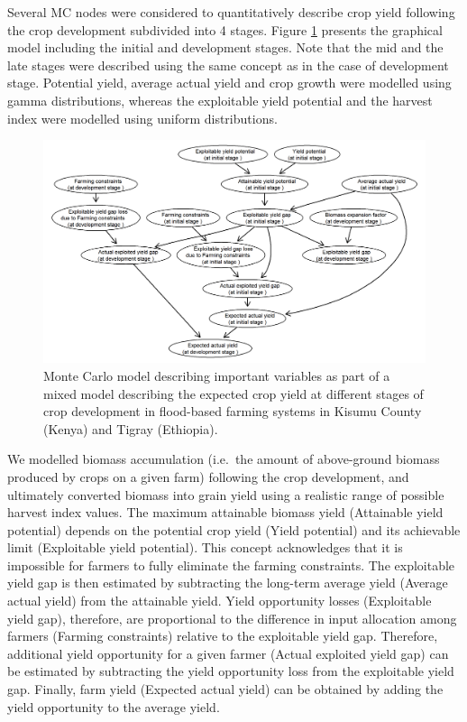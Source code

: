 \documentclass[]{elsarticle} %
\begin{document}
Several MC nodes were considered to quantitatively describe crop yield following the crop development subdivided into 4 stages. Figure \ref{fig:fig9} presents the graphical model including the initial and development stages. Note that the mid and the late stages were described using the same concept as in the case of development stage. Potential yield, average actual yield and crop growth were modelled using gamma distributions, whereas the exploitable yield potential and the harvest index were modelled using uniform distributions.

\begin{figure}[!h]

{\centering \includegraphics[width=1\linewidth,]{figures/figure_s9} 

}

\caption{Monte Carlo model describing important variables as part of a mixed model describing the expected crop yield at different stages of crop development in flood-based farming systems in Kisumu County (Kenya) and Tigray (Ethiopia).}\label{fig:fig9}
\end{figure}

We modelled biomass accumulation (i.e.~the amount of above-ground biomass produced by crops on a given farm) following the crop development, and ultimately converted biomass into grain yield using a realistic range of possible harvest index values. The maximum attainable biomass yield (Attainable yield potential) depends on the potential crop yield (Yield potential) and its achievable limit (Exploitable yield potential). This concept acknowledges that it is impossible for farmers to fully eliminate the farming constraints. The exploitable yield gap is then estimated by subtracting the long-term average yield (Average actual yield) from the attainable yield. Yield opportunity losses (Exploitable yield gap), therefore, are proportional to the difference in input allocation among farmers (Farming constraints) relative to the exploitable yield gap. Therefore, additional yield opportunity for a given farmer (Actual exploited yield gap) can be estimated by subtracting the yield opportunity loss from the exploitable yield gap. Finally, farm yield (Expected actual yield) can be obtained by adding the yield opportunity to the average yield.
\end{document}
